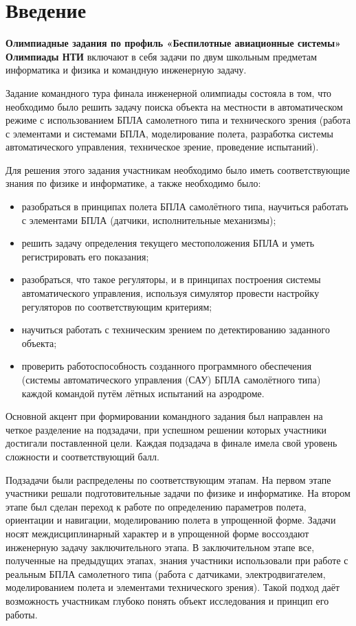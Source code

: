%

\section*{Введение}

\textbf{Олимпиадные задания по профиль «Беспилотные авиационные системы» Олимпиады НТИ} включают в себя задачи по двум школьным предметам информатика и физика и командную инженерную задачу.

Задание командного тура финала инженерной олимпиады состояла в том, что необходимо было решить задачу поиска объекта на местности в автоматическом режиме с использованием БПЛА самолетного типа и технического зрения (работа с элементами и системами БПЛА, моделирование полета, разработка системы автоматического управления, техническое зрение, проведение испытаний).

Для решения этого задания участникам необходимо было иметь соответствующие знания по физике и информатике, а также необходимо было:
\begin{itemize}
    \item разобраться в принципах полета БПЛА самолётного типа, научиться работать с элементами БПЛА (датчики, исполнительные механизмы);
    \item решить задачу определения текущего местоположения БПЛА и уметь регистрировать его показания;
    \item разобраться, что такое регуляторы, и в принципах построения системы автоматического управления, используя симулятор провести настройку регуляторов по соответствующим критериям;
    \item научиться работать с техническим зрением по детектированию заданного объекта;
    \item проверить работоспособность созданного программного обеспечения (системы автоматического управления (САУ) БПЛА самолётного типа) каждой командой путём лётных испытаний на аэродроме.
\end{itemize}

Основной акцент при формировании командного задания был направлен на четкое разделение на подзадачи, при успешном решении которых участники достигали поставленной цели. Каждая подзадача в финале имела свой уровень сложности и соответствующий балл.

Подзадачи были распределены по соответствующим этапам. На первом этапе участники решали подготовительные задачи по физике и информатике. На втором этапе был сделан переход к работе по определению параметров полета, ориентации и навигации, моделированию полета в упрощенной форме. Задачи носят междисциплинарный характер и в упрощенной форме воссоздают инженерную задачу заключительного этапа. В заключительном этапе все, полученные на предыдущих этапах, знания участники использовали при работе с реальным БПЛА самолетного типа (работа с датчиками, электродвигателем, моделированием полета и элементами технического зрения). Такой подход даёт возможность участникам глубоко понять объект исследования и принцип его работы.